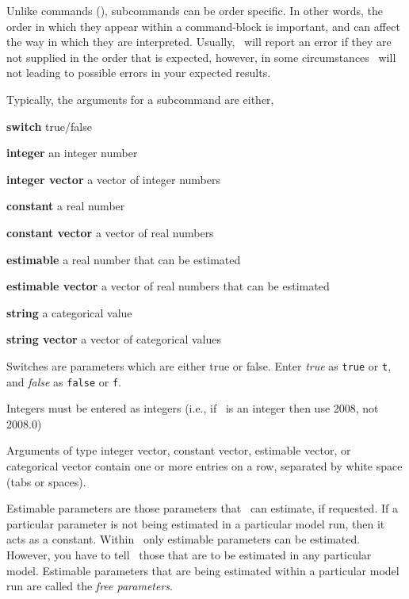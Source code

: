 Unlike commands (), subcommands can be order specific. In other words, the order in which they appear within a command-block is important, and can affect the way in which they are interpreted. Usually, \SPM\ will report an error if they are not supplied in the order that is expected, however, in some circumstances \SPM\ will not \textemdash leading to possible errors in your expected results.  

Typically, the arguments for a subcommand are either,

\begin{description}
\item \textbf{switch} true/false 
\item \textbf{integer} an integer number
\item \textbf{integer vector} a vector of integer numbers
\item \textbf{constant} a real number 
\item \textbf{constant vector} a vector of real numbers
\item \textbf{estimable} a real number that can be estimated
\item \textbf{estimable vector} a vector of real numbers that can be estimated
\item \textbf{string} a categorical value
\item \textbf{string vector} a vector of categorical values
\end{description}

Switches are parameters which are either true or false. Enter \emph{true} as \texttt{true} or \texttt{t}, and \emph{false} as \texttt{false} or \texttt{f}. 

Integers must be entered as integers (i.e., if \ is an integer then use 2008, not 2008.0)

Arguments of type integer vector, constant vector, estimable vector, or categorical vector contain one or more entries on a row, separated by white space (tabs or spaces). 

Estimable parameters are those parameters that \SPM\ can estimate, if requested. If a particular parameter is not being estimated in a particular model run, then it acts as a constant.  Within \SPM\, only estimable parameters can be estimated. However, you have to tell \SPM\ those that are to be estimated in any particular model. Estimable parameters that are being estimated within a particular model run are called the \emph{free parameters}.

